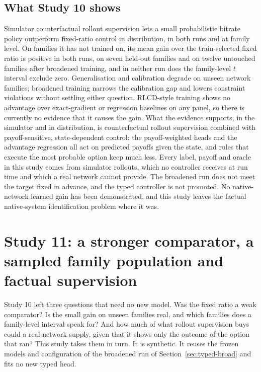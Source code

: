 \documentclass[10pt]{article}
\begin{document}
\subsection{What Study 10 shows}
Simulator counterfactual rollout supervision lets a small probabilistic bitrate policy outperform fixed-ratio control in distribution, in both runs and at family level. On families it has not trained on, its mean gain over the train-selected fixed ratio is positive in both runs, \TypedAuditOodBayesVsTrain{} on seven held-out families and \TypedBroadTestOodBayesVsTrain{} on twelve untouched families after broadened training, and in neither run does the family-level $t$ interval exclude zero. Generalisation and calibration degrade on unseen network families; broadened training narrows the calibration gap and lowers constraint violations without settling either question. RLCD-style training shows no advantage over exact-gradient or regression baselines on any panel, so there is currently no evidence that it causes the gain. What the evidence supports, in the simulator and in distribution, is counterfactual rollout supervision combined with payoff-sensitive, state-dependent control: the payoff-weighted heads and the advantage regression all act on predicted payoffs given the state, and rules that execute the most probable option keep much less. Every label, payoff and oracle in this study comes from simulator rollouts, which no controller receives at run time and which a real network cannot provide. The broadened run does not meet the target fixed in advance, and the typed controller is not promoted. No native-network learned gain has been demonstrated, and this study leaves the factual native-system identification problem where it was.

\section{Study 11: a stronger comparator, a sampled family population and factual supervision}
\label{sec:typed-followup}
Study 10 left three questions that need no new model. Was the fixed ratio a weak comparator? Is the small gain on unseen families real, and which families does a family-level interval speak for? And how much of what rollout supervision buys could a real network supply, given that it shows only the outcome of the option that ran? This study takes them in turn. It is synthetic. It reuses the frozen models and configuration of the broadened run of Section~\ref{sec:typed-broad} and fits no new typed head.
\end{document}
